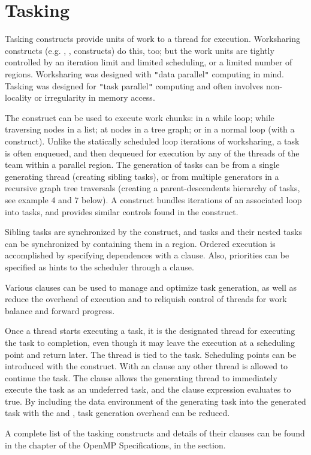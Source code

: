 \pagebreak
\chapter{Tasking}
\label{chap:tasking}

Tasking constructs provide units of work to a thread for execution.  
Worksharing constructs (e.g. , ,  constructs) do this, too; 
but the work units are tightly controlled by an iteration limit and limited 
scheduling, or a limited number of  regions. Worksharing was designed 
with \texttt{"}data parallel\texttt{"} computing in mind.  Tasking was designed for 
\texttt{"}task parallel\texttt{"} computing and often involves non-locality or irregularity 
in memory access.

The  construct can be used to execute work chunks: in a while loop; 
while traversing nodes in a list; at nodes in a tree graph; 
or in a normal loop (with a  construct).  
Unlike the statically scheduled loop iterations of worksharing, a task is 
often enqueued, and then dequeued for execution by any of the threads of the
team within a parallel region. The generation of tasks can be from a single 
generating thread (creating sibling tasks), or from multiple generators
in a recursive graph tree traversals (creating a parent-descendents
hierarchy of tasks, see example 4 and 7  below). A  construct
bundles iterations of an associated loop into tasks, and provides 
similar controls found in the  construct.

Sibling tasks are synchronized by the  construct, and tasks
and their nested tasks can be synchronized by containing them in
a  region.  Ordered execution is accomplished by specifying
dependences with a  clause. Also, priorities can be
specified as hints to the scheduler through a  clause.

Various clauses can be used to manage and optimize task generation,
as well as reduce the overhead of execution and to reliquish 
control of threads for work balance and forward progress. 

Once a thread starts executing a task, it is the designated thread 
for executing the task to completion, even though it may leave the
execution at a scheduling point and return later.  The thread is tied
to the task.  Scheduling points can be introduced with the 
construct.  With an  clause any other thread is allowed to continue
the task.  The  clause allows the generating thread to immediately
execute the task as an undeferred task, and the clause expression evaluates to true.
By including the data environment of the generating task into the generated task with the 
 and , task generation overhead can be reduced.

A complete list of the tasking constructs and details of their clauses
can be found in the  chapter of the OpenMP Specifications,
in the  section.

